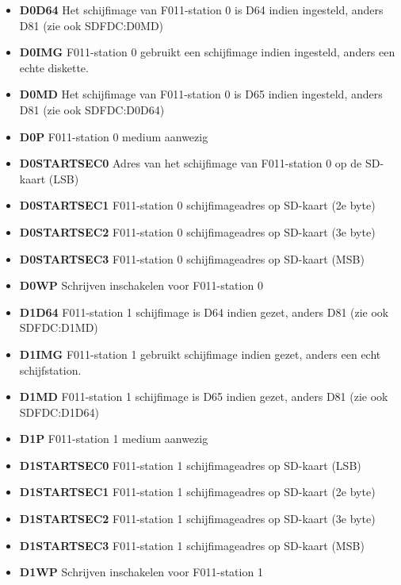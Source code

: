\begin{itemize}
\item{\bf{D0D64}} Het schijfimage van F011-station 0 is D64 indien ingesteld, anders D81 (zie ook SDFDC:D0MD)
\item{\bf{D0IMG}} F011-station 0 gebruikt een schijfimage indien ingesteld, anders een echte diskette.
\item{\bf{D0MD}} Het schijfimage van F011-station 0 is D65 indien ingesteld, anders D81 (zie ook SDFDC:D0D64)
\item{\bf{D0P}} F011-station 0 medium aanwezig
\item{\bf{D0STARTSEC0}} Adres van het schijfimage van F011-station 0 op de SD-kaart (LSB)
\item{\bf{D0STARTSEC1}} F011-station 0 schijfimageadres op SD-kaart (2e byte)
\item{\bf{D0STARTSEC2}} F011-station 0 schijfimageadres op SD-kaart (3e byte)
\item{\bf{D0STARTSEC3}} F011-station 0 schijfimageadres op SD-kaart (MSB)
\item{\bf{D0WP}} Schrijven inschakelen voor F011-station 0
\item{\bf{D1D64}} F011-station 1 schijfimage is D64 indien gezet, anders D81 (zie ook SDFDC:D1MD)
\item{\bf{D1IMG}} F011-station 1 gebruikt schijfimage indien gezet, anders een echt schijfstation.
\item{\bf{D1MD}} F011-station 1 schijfimage is D65 indien gezet, anders D81 (zie ook SDFDC:D1D64)
\item{\bf{D1P}} F011-station 1 medium aanwezig
\item{\bf{D1STARTSEC0}} F011-station 1 schijfimageadres op SD-kaart (LSB)
\item{\bf{D1STARTSEC1}} F011-station 1 schijfimageadres op SD-kaart (2e byte)
\item{\bf{D1STARTSEC2}} F011-station 1 schijfimageadres op SD-kaart (3e byte)
\item{\bf{D1STARTSEC3}} F011-station 1 schijfimageadres op SD-kaart (MSB)
\item{\bf{D1WP}} Schrijven inschakelen voor F011-station 1

\end{itemize}
